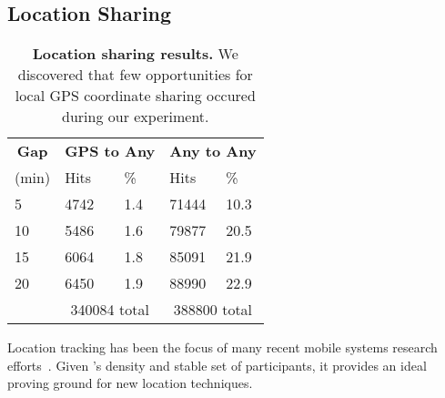 \subsection{Location Sharing}
\label{subsec-locationsharing}

\begin{table}[t]
\begin{tabularx}{\columnwidth}{XXXXX}
\multicolumn{1}{c}{\normalsize{\textbf{Gap}}} &
\multicolumn{2}{c}{\normalsize{\textbf{GPS to Any}}} &
\multicolumn{2}{c}{\normalsize{\textbf{Any to Any}}} \\
\multicolumn{1}{c}{(min)} &
\multicolumn{1}{l}{Hits} &
\multicolumn{1}{l}{\%} &
\multicolumn{1}{l}{Hits} &
\multicolumn{1}{l}{\%} \\
\toprule
5 & \num{4742} & 1.4 & \num{71444} & 10.3 \\
10 & \num{5486} & 1.6 & \num{79877} & 20.5 \\
15 & \num{6064} & 1.8 & \num{85091} & 21.9 \\
20 & \num{6450} & 1.9 & \num{88990} & 22.9 \\
\midrule
& \multicolumn{2}{c}{\num{340084} total}
& \multicolumn{2}{c}{\num{388800} total} \\
\end{tabularx}
\caption{\textbf{Location sharing results.} We discovered that few
opportunities for local GPS coordinate sharing occured during our
experiment.}
\label{table-locationsharing}
\end{table}

Location tracking has been the focus of many recent mobile systems research
efforts~\cite{FIXME,FIXME,FIXME}. Given \PhoneLab{}'s density and stable set
of participants, it provides an ideal proving ground for new location
techniques.
